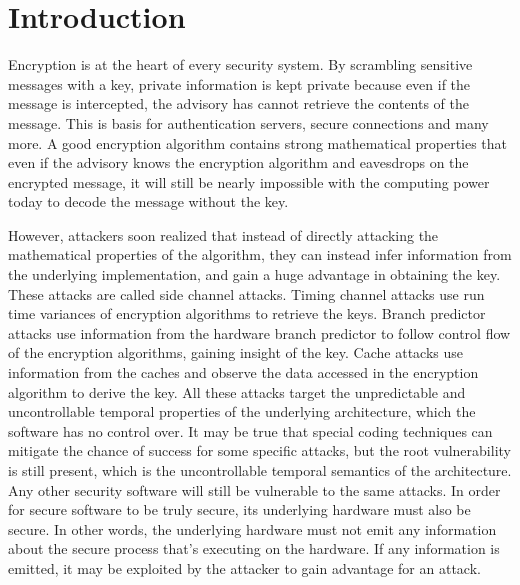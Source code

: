 \documentclass[times, 10pt,twocolumn]{article}
\begin{document}
\section{Introduction}
Encryption is at the heart of every security system. By scrambling sensitive messages with a key, private information is kept private because even if the message is intercepted, the advisory has cannot retrieve the contents of the message. This is basis for authentication servers, secure connections and many more. A good encryption algorithm contains strong mathematical properties that even if the advisory knows the encryption algorithm and eavesdrops on the encrypted message, it will still be nearly impossible with the computing power today to decode the message without the key.

However, attackers soon realized that instead of directly attacking the mathematical properties of the algorithm, they can instead infer information from the underlying implementation, and gain a huge advantage in obtaining the key. These attacks are called side channel attacks. Timing channel attacks use run time variances of encryption algorithms to retrieve the keys. Branch predictor attacks use information from the hardware branch predictor to follow control flow of the encryption algorithms, gaining insight of the key. Cache attacks use information from the caches and observe the data accessed in the encryption algorithm to derive the key. All these attacks target the unpredictable and uncontrollable temporal properties of the underlying architecture, which the software has no control over.  It may be true that special coding techniques can mitigate the chance of success for some specific attacks, but the root vulnerability is still present, which is the uncontrollable temporal semantics of the architecture. Any other security software will still be vulnerable to the same attacks. In order for secure software to be truly secure, its underlying hardware must also be secure. In other words, the underlying hardware must not emit any information about the secure process that's executing on the hardware. If any information is emitted, it may be exploited by the attacker to gain advantage for an attack. 
\end{document}
